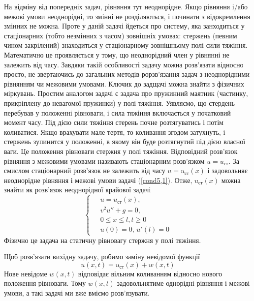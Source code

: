 На відміну від попередніх задач, рівняння тут неоднорідне. Якщо рівняння і/або межові умови неоднорідні, то змінні не розділяються, і починати з відокремлення змінних не можна. Проте у даній задачі йдеться про систему, яка занходиться у стаціонарних (тобто незмінних з часом) зовнішніх умовах: стержень (певним чином закрілений) знаходиться у стаціонарному зовнішньому полі сили тяжіння. Математично це проявляється у тому, що неоднорідний член у рівнянні не залежить від часу.  Завдяки такій особливості задачу можна розв'язати відносно просто, не звертаючись до загальних методів рорзв'язання задач з неоднорідними рівнянням чи межовими умовами. Ключик до задщачі можна знайти з фізичних міркувань. 
Простим аналогом задачі є задача про пружинний маятник (частинку, прикріплену до невагомої пружинки) у полі тяжіння. Уявляємо, що стердень перебував у положенні рівноваги, і сила тяжіння включається у початковий момент часу. Під дією сили тяжіння стерень почне розтягуватись і потім коливатися. Якщо врахувати мале тертя, то коливання згодом затухнуть, і стержень зупинится у положенні, в якому він буде  розтягнутий під дією власної ваги. Це положення  рівноваги стержня у полі тяжіння.  Відповідний розв'язок рівняння з межовими умовами називають стаціонарним розв'язком $u = u_{\text{ст}}$. За смислом стаціонарний розв'язок не залежить від часу $u = u_{\text{ст}}(x)$ і задовольняє неоднорідне рівняння і межові умови задачі (\ref{cond5,1}). Отже, $u_{\text{ст}}(x)$ можна знайти як розв'язок неоднорідної крайової задачі 
\begin{equation} \label{stat sol}
    \left\{ \begin{aligned}
            \;&u = u_{\text{ст}}(x), \\
            &v^2 u'' + g = 0, \\
            &0 \leq x \leq l, t \geq 0 \\
            &u(0) = 0, \, u'(l) = 0
    \end{aligned} \right.
\end{equation}
 Фізично це задача на статичну рівновагу стержня у полі тяжіння. 
 
 Щоб розв'язати вихідну задачу, робимо заміну невідомої функції 
\begin{equation} \label{subst w}
    u(x,t) = u_{\text{ст}}(x) + w(x,t)
\end{equation}
 Нове невідоме $w(x,t)$ відповідає вільним коливанням відносно нового положення рівноваги. Тому $w(x,t)$ задовольнятиме однорідні рівняння і межові умови, а такі задачі ми вже вміємо розв'язувати. 

